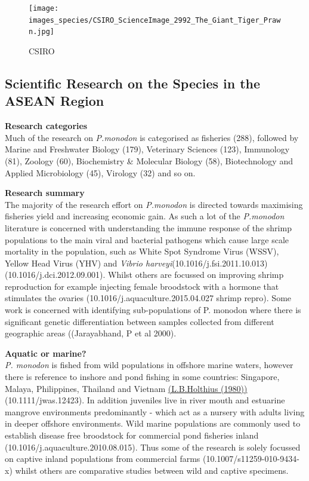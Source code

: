 \documentclass[]{book}
\theoremstyle{definition}
\theoremstyle{definition}
\theoremstyle{definition}
\theoremstyle{remark}
\begin{document}
\begin{figure}
\centering
\texttt{[image: images\_species/CSIRO\_ScienceImage\_2992\_The\_Giant\_Tiger\_Prawn.jpg]}
\caption{CSIRO}
\end{figure}

\hypertarget{scientific-research-on-the-species-in-the-asean-region-4}{%
\subsection{Scientific Research on the Species in the ASEAN
Region}\label{scientific-research-on-the-species-in-the-asean-region-4}}

\textbf{Research categories}\\
Much of the research on \emph{P.monodon} is categorised as fisheries
(288), followed by Marine and Freshwater Biology (179), Veterinary
Sciences (123), Immunology (81), Zoology (60), Biochemistry \& Molecular
Biology (58), Biotechnology and Applied Microbiology (45), Virology (32)
and so on.

\textbf{Research summary}\\
The majority of the research effort on \emph{P.monodon} is directed
towards maximising fisheries yield and increasing economic gain. As such
a lot of the \emph{P.monodon} literature is concerned with understanding
the immune response of the shrimp populations to the main viral and
bacterial pathogens which cause large scale mortality in the population,
such as White Spot Syndrome Virus (WSSV), Yellow Head Virus (YHV) and
\emph{Vibrio harveyi}(10.1016/j.fsi.2011.10.013)
(10.1016/j.dci.2012.09.001). Whilst others are focussed on improving
shrimp reproduction for example injecting female broodstock with a
hormone that stimulates the ovaries (10.1016/j.aquaculture.2015.04.027
shrimp repro). Some work is concerned with identifying sub-populations
of P. monodon where there is significant genetic differentiation between
samples collected from different geographic areas ((Jarayabhand, P et al
2000).

\textbf{Aquatic or marine?}\\
\emph{P. monodon} is fished from wild populations in offshore marine
waters, however there is reference to inshore and pond fishing in some
countries: Singapore, Malaya, Philippines, Thailand and Vietnam
\href{http://www.fao.org/fishery/species/3405/en}{(L.B.Holthius (1980))}
(10.1111/jwas.12423). In addition juveniles live in river mouth and
estuarine mangrove environments predominantly - which act as a nursery
with adults living in deeper offshore environments. Wild marine
populations are commonly used to establish disease free broodstock for
commercial pond fisheries inland (10.1016/j.aquaculture.2010.08.015).
Thus some of the research is solely focussed on captive inland
populations from commercial farms (10.1007/s11259-010-9434-x) whilst
others are comparative studies between wild and captive specimens.
\end{document}
